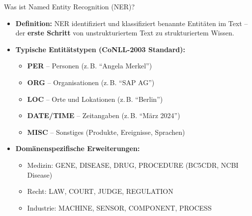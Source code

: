 \documentclass[aspectratio=1610, xcolor=dvipsnames, 9pt]{beamer}
\begin{document}
\begin{frame}{Was ist Named Entity Recognition (NER)?}
  \begin{itemize}
    \item \textbf{Definition:} NER identifiziert und klassifiziert benannte Entitäten im Text -- der \textbf{erste Schritt} von unstrukturiertem Text zu strukturiertem Wissen.
    \item \textbf{Typische Entitätstypen (CoNLL-2003 Standard):}
      \begin{itemize}
        \item \textbf{PER} -- Personen (z.\,B. ``Angela Merkel'')
        \item \textbf{ORG} -- Organisationen (z.\,B. ``SAP AG'')
        \item \textbf{LOC} -- Orte und Lokationen (z.\,B. ``Berlin'')
        \item \textbf{DATE/TIME} -- Zeitangaben (z.\,B. ``März 2024'')
        \item \textbf{MISC} -- Sonstiges (Produkte, Ereignisse, Sprachen)
      \end{itemize}
    \item \textbf{Domänenspezifische Erweiterungen:}
      \begin{itemize}
        \item Medizin: GENE, DISEASE, DRUG, PROCEDURE (BC5CDR, NCBI Disease)
        \item Recht: LAW, COURT, JUDGE, REGULATION
        \item Industrie: MACHINE, SENSOR, COMPONENT, PROCESS
      \end{itemize}
  \end{itemize}
\end{frame}
\end{document}
